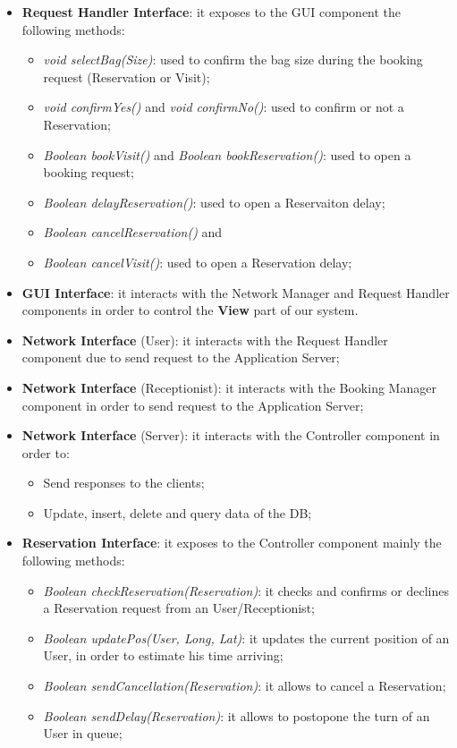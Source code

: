 \begin{itemize}

\item \textbf{Request Handler Interface}: it exposes to the GUI component the following methods:
\begin{itemize}
\item \textit{void selectBag(Size)}: used to confirm the bag size during the booking request (Reservation or Visit);
\item \textit{void confirmYes()} and \textit{void confirmNo()}: used to confirm or not a Reservation;
\item \textit{Boolean bookVisit()} and \textit{Boolean bookReservation()}: used to open a booking request;
\item \textit{Boolean delayReservation()}: used to open a Reservaiton delay;
\item \textit{Boolean cancelReservation()} and \item \textit{Boolean cancelVisit()}: used to open a Reservation delay;
\end{itemize}

\item \textbf{GUI Interface}: it interacts with the Network Manager and Request Handler components in order to control the \textbf{View} part of our system. 

\item \textbf{Network Interface} (User): it interacts with the Request Handler component due to send request to the Application Server;

\item \textbf{Network Interface} (Receptionist): it interacts with the Booking Manager component in order to send request to the Application Server;

\item \textbf{Network Interface} (Server): it interacts with the Controller component in order to:
\begin{itemize}
\item Send responses to the clients;
\item Update, insert, delete and query data of the DB;
\end{itemize}

\item \textbf{Reservation Interface}: it exposes to the Controller component mainly the following methods:
\begin{itemize}
\item \textit{Boolean checkReservation(Reservation)}: it checks and confirms or declines a Reservation request from an User/Receptionist;
\item \textit{Boolean updatePos(User, Long, Lat)}: it updates the current position of an User, in order to estimate his time arriving;
\item \textit{Boolean sendCancellation(Reservation)}: it allows to cancel a Reservation; 
\item \textit{Boolean sendDelay(Reservation)}: it allows to postopone the turn of an User in queue;
\end{itemize}




\end{itemize}
